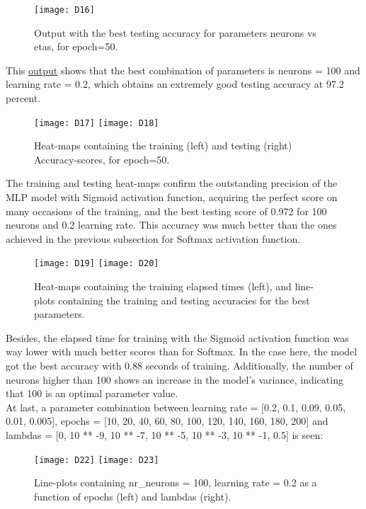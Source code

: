 \begin{figure}[H]
\label{fig:D10}
\centering
\texttt{[image: D16]}
\caption{Output with the best testing accuracy for parameters neurons vs etas, for epoch=50.}
\end{figure}

This \hyperref[fig:D10]{output} shows that the best combination of parameters is neurons = 100 and learning rate = 0.2, which obtains an extremely good testing accuracy at 97.2 percent.

\begin{figure}[H]
\label{fig:D11}
\centering
\texttt{[image: D17]}
\texttt{[image: D18]}
\caption{Heat-maps containing the training (left) and testing (right) Accuracy-scores, for epoch=50.}
\end{figure}

The training and testing heat-maps confirm the outstanding precision of the MLP model with Sigmoid activation function, acquiring the perfect score on many occasions of the training, and the best testing score of 0.972 for 100 neurons and 0.2 learning rate. This accuracy was much better than the ones achieved in the previous subsection for Softmax activation function.

\begin{figure}[H]
\label{fig:D12}
\centering
\texttt{[image: D19]}
\texttt{[image: D20]}
\caption{Heat-maps containing the training elapsed times (left), and line-plots containing the training and testing accuracies for the best parameters.}
\end{figure}

Besides, the elapsed time for training with the Sigmoid activation function was way lower with much better scores than for Softmax. In the case here, the model got the best accuracy with 0.88 seconds of training. Additionally, the number of neurons higher than 100 shows an increase in the model's variance, indicating that 100 is an optimal parameter value.\\

At last, a parameter combination between learning rate = [0.2, 0.1, 0.09, 0.05, 0.01, 0.005], epochs = [10, 20, 40, 60, 80, 100, 120, 140, 160, 180, 200] and lambdas = [0, 10 ** -9, 10 ** -7, 10 ** -5, 10 ** -3, 10 ** -1, 0.5] is seen:

\begin{figure}[H]
\label{fig:D14}
\centering
\texttt{[image: D22]}
\texttt{[image: D23]}
\caption{Line-plots containing nr\_neurons = 100, learning rate = 0.2 as a function of epochs (left) and lambdas (right).}
\end{figure}

